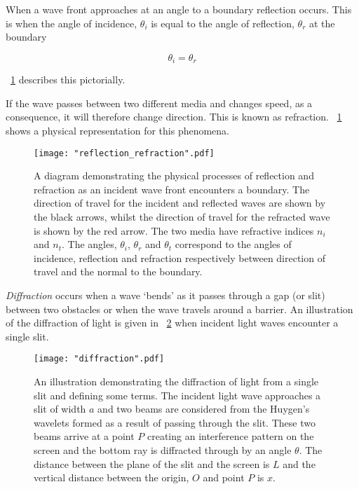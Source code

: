 \documentclass{article}
\newcommand{\figref}[2][\figurename~]{#1\ref{#2}}
\begin{document}
\vspace{2mm}
\noindent
When a wave front approaches at an angle to a boundary reflection occurs. This is when the angle of incidence, $\theta_i$ is equal to the angle of reflection, $\theta_r$ at the boundary

\begin{equation}
\label{eq:reflection}
\theta_i = \theta_r
\end{equation}

\vspace{2mm}
\noindent
\figref{fig:reflection_refraction} describes this pictorially.

\vspace{2mm}
\noindent
If the wave passes between two different media and changes speed, as a consequence, it will therefore change direction. This is known as refraction. \figref{fig:reflection_refraction} shows a physical representation for this phenomena.

\begin{figure}[h]
\centering
\texttt{[image: "reflection\_refraction".pdf]}
\caption{A diagram demonstrating the physical processes of reflection and refraction as an incident wave front encounters a boundary. The direction of travel for the incident and reflected waves are shown by the black arrows, whilst the direction of travel for the refracted wave is shown by the red arrow. The two media have refractive indices $n_i$ and $n_t$. The angles, $\theta_i$, $\theta_r$ and $\theta_t$ correspond to the angles of incidence, reflection and refraction respectively between direction of travel and the normal to the boundary.}
\label{fig:reflection_refraction}
\end{figure}

\vspace{2mm}
\noindent
\textit{Diffraction} occurs when a wave `bends' as it passes through a gap (or slit) between two obstacles or when the wave travels around a barrier. An illustration of the diffraction of light is given in \figref{fig:diffraction} when incident light waves encounter a single slit.

\begin{figure}[h]
\centering
\texttt{[image: "diffraction".pdf]}
\caption{An illustration demonstrating the diffraction of light from a single slit and defining some terms. The incident light wave approaches a slit of width $a$ and two beams are considered from the Huygen's wavelets \cite{Book01} formed as a result of passing through the slit. These two beams arrive at a point $P$ creating an interference pattern on the screen and the bottom ray is diffracted through by an angle $\theta$. The distance between the plane of the slit and the screen is $L$ and the vertical distance between the origin, $O$ and point $P$ is $x$. }
\label{fig:diffraction}
\end{figure}
\end{document}
